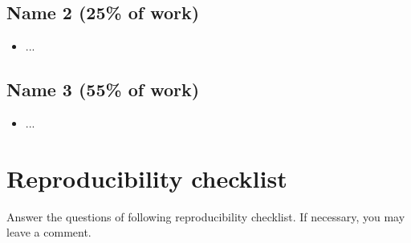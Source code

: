 \documentclass{article}
\begin{document}
\subsection*{Name 2 (25\% of work)}
\begin{itemize}
  \item ...
\end{itemize}

\subsection*{Name 3 (55\% of work)}
\begin{itemize}
  \item ...
\end{itemize}

\clearpage
\section{Reproducibility checklist}
\label{appendix-checklist}
Answer the questions of following reproducibility checklist. If necessary, you may leave a comment.
\end{document}
